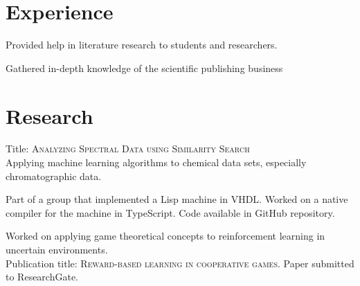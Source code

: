\documentclass[]{deedy-resume-openfont}
\begin{document}
\begin{minipage}[t]{0.66\textwidth}


\section{Experience}

\vspace{\topsep} %
\begin{tightemize}
\item Provided help in literature research to students and researchers.
\item Gathered in-depth knowledge of the scientific publishing business
\end{tightemize}
\sectionsep


\section{Research}
\descript{}
Title: \textsc{Analyzing Spectral Data using Similarity Search} \\
Applying machine learning algorithms to chemical data sets, especially
chromatographic data.
\sectionsep

Part of a group that implemented a Lisp machine in VHDL. Worked
on a native compiler for the machine in TypeScript. Code available
in GitHub repository.

\descript{}
Worked on applying game theoretical concepts to reinforcement learning in uncertain environments. \\
Publication title: \textsc{Reward-based learning in cooperative games}. Paper submitted to ResearchGate.
\sectionsep


\end{minipage}
\end{document}
